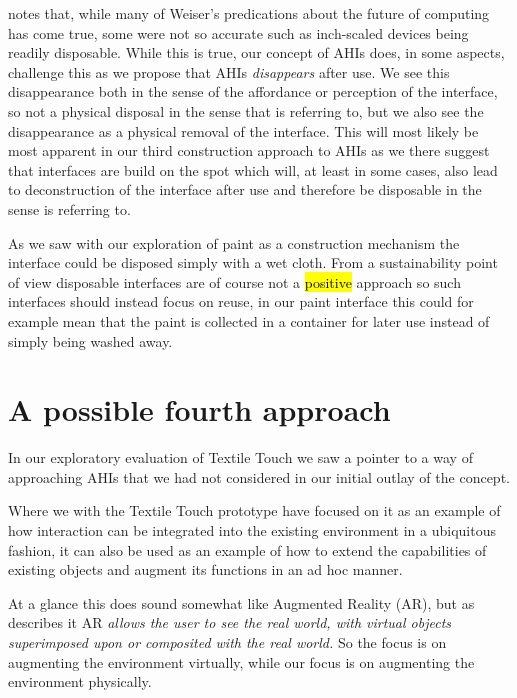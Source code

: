 \citet{abowd2012next} notes that, while many of Weiser's predications about the future of computing has come true, some were not so accurate such as inch-scaled devices being readily disposable.
While this is true, our concept of AHIs does, in some aspects, challenge this as we propose that AHIs \emph{disappears} after use.
We see this disappearance both in the sense of the affordance or perception of the interface, so not a physical disposal in the sense that \citeauthor{abowd2012next} is referring to, but we also see the disappearance as a physical removal of the interface.
This will most likely be most apparent in our third construction approach to AHIs as we there suggest that interfaces are build on the spot which will, at least in some cases, also lead to deconstruction of the interface after use and therefore be disposable in the sense \citeauthor{abowd2012next} is referring to.

As we saw with our exploration of paint as a construction mechanism the interface could be disposed simply with a wet cloth.
From a sustainability point of view disposable interfaces are of course not a \hl{positive} approach so such interfaces should instead focus on reuse, in our paint interface this could for example mean that the paint is collected in a container for later use instead of simply being washed away. 

\section{A possible fourth approach}
In our exploratory evaluation of Textile Touch we saw a pointer to a way of approaching AHIs that we had not considered in our initial outlay of the concept.


Where we with the Textile Touch prototype have focused on it as an example of how interaction can be integrated into the existing environment in a ubiquitous fashion, it can also be used as an example of how to extend the capabilities of existing objects and augment its functions in an ad hoc manner.

At a glance this does sound somewhat like Augmented Reality (AR), but as \citet{azuma1997survey} describes it AR \emph{allows the user to see the real world, with virtual objects superimposed upon or composited with the real world.}
So the focus is on augmenting the environment virtually, while our focus is on augmenting the environment physically.

